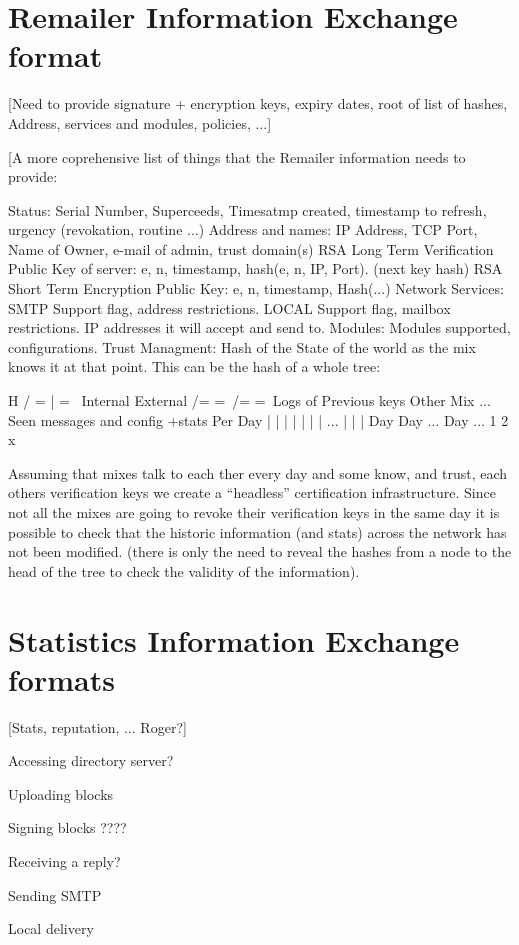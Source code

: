\section{Remailer Information Exchange format}

[Need to provide signature + encryption keys, expiry dates, root of
list of hashes, Address, services and modules, policies, ...]

[A more coprehensive list of things that the Remailer information
needs to provide:

Status: Serial Number, Superceeds, Timesatmp created, timestamp to
        refresh, urgency (revokation, routine ...)	  
Address and names: IP Address, TCP Port, Name of Owner, e-mail of
                   admin, trust domain(s) 
RSA Long Term Verification Public Key of server: e, n, timestamp,
                   hash(e, n, IP, Port). (next key hash)
RSA Short Term Encryption Public Key: e, n, timestamp, Hash(...)
Network Services: SMTP Support flag, address restrictions.
                  LOCAL Support flag, mailbox restrictions.
	          IP addresses it will accept and send to.
Modules: Modules supported, configurations.
Trust Managment: Hash of the State of the world as the mix knows it at
        that point. This can be the hash of a whole tree:

		           H
             / =           |                   = \
	Internal                               External
 /=                  =\                     /=        =\
Logs of           Previous keys          Other Mix    ...
Seen messages     and config +stats       Per Day
|   |    |   |    |   |   |  ...          |   |   |
Day Day ...  Day  ...
1   2        x


Assuming that mixes talk to each ther every day and some know, and
trust, each others verification keys we create a ``headless''
certification infrastructure. Since not all the mixes are going to
revoke their verification keys in the same day it is possible to 
check that the historic information (and stats) across the network has
not been modified. (there is only the need to reveal the hashes from a
node to the head of the tree to check the validity of the information).

\section{Statistics Information Exchange formats}

[Stats, reputation, ... Roger?]

Accessing directory server?

Uploading blocks

Signing blocks ????

Receiving a reply?

Sending SMTP

Local delivery

